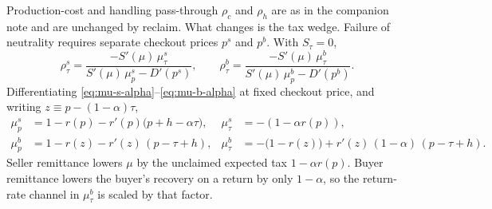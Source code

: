 \documentclass[11pt]{article}
\begin{document}
Production-cost and handling pass-through $\rho_c$ and $\rho_h$ are as in the
companion note and are unchanged by reclaim.  What changes is the tax wedge.
Failure of neutrality requires separate checkout prices $p^{s}$ and $p^{b}$.
With $S_{\tau}=0$,
\begin{equation}
  \rho^{s}_{\tau}
  = \frac{-S'(\mu)\,\mu^{s}_{\tau}}{S'(\mu)\,\mu^{s}_{p}-D'(p^{s})},
  \qquad
  \rho^{b}_{\tau}
  = \frac{-S'(\mu)\,\mu^{b}_{\tau}}{S'(\mu)\,\mu^{b}_{p}-D'(p^{b})}.
  \label{eq:rho-tau-general}
\end{equation}
Differentiating \eqref{eq:mu-s-alpha}--\eqref{eq:mu-b-alpha} at fixed checkout
price, and writing $z\equiv p-(1-\alpha)\tau$,
\begin{align}
  \mu^{s}_{p}
  &= 1-r(p)-r'(p)\bigl(p+h-\alpha\tau\bigr),
  &
  \mu^{s}_{\tau}
  &= -(1-\alpha r(p)),
  \label{eq:mu-s-partials}
  \\
  \mu^{b}_{p}
  &= 1-r(z)-r'(z)\,(p-\tau+h),
  &
  \mu^{b}_{\tau}
  &= -\bigl(1-r(z)\bigr)+r'(z)\,(1-\alpha)\,(p-\tau+h).
  \label{eq:mu-b-partials}
\end{align}
Seller remittance lowers $\mu$ by the unclaimed expected tax $1-\alpha r(p)$.
Buyer remittance lowers the buyer's recovery on a return by only $1-\alpha$,
so the return-rate channel in $\mu^{b}_{\tau}$ is scaled by that factor.
\end{document}

